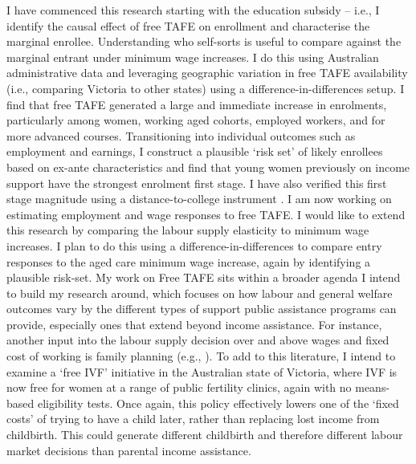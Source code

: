I have commenced this research starting with the education subsidy -- i.e., I identify the causal effect of free TAFE on enrollment and characterise the marginal enrollee. Understanding who self-sorts is useful to compare against the marginal entrant under minimum wage increases. I do this using Australian administrative data and leveraging geographic variation in free TAFE availability (i.e., comparing Victoria to other states) using a difference-in-differences setup. I find that free TAFE generated a large and immediate increase in enrolments, particularly among women, working aged cohorts, employed workers, and for more advanced courses. Transitioning into individual outcomes such as employment and earnings, I construct a plausible `risk set' of likely enrollees based on ex-ante characteristics and find that young women previously on income support have the strongest enrolment first stage. I have also verified this first stage magnitude using a distance-to-college instrument \citep{card1995}. I am now working on estimating employment and wage responses to free TAFE. I would like to extend this research by comparing the labour supply elasticity to minimum wage increases. I plan to do this using a difference-in-differences to compare entry responses to the aged care minimum wage increase, again by identifying a plausible risk-set.
 My work on Free TAFE sits within a broader agenda I intend to build my research around, which focuses on how labour and general welfare outcomes vary by the different types of support public assistance programs can provide, especially ones that extend beyond income assistance. For instance, another input into the labour supply decision over and above wages and fixed cost of working is family planning (e.g., \cite{gallen2026}). To add to this literature, I intend to examine a `free IVF' initiative in the Australian state of Victoria, where IVF is now free for women at a range of public fertility clinics, again with no means-based eligibility tests. Once again, this policy effectively lowers one of the `fixed costs' of trying to have a child later, rather than replacing lost income from childbirth. This could generate different childbirth and therefore different labour market decisions than parental income assistance.





